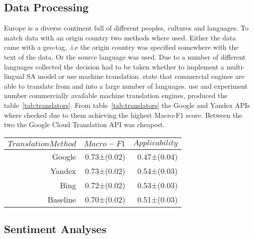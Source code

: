 \subsection{Data Processing}

Europe is a diverse continent full of different peoples, cultures and languages.
To match data with an origin country two methods where used.
Either the data came with a geo-tag, .i.e the origin country was specified somewhere with the text of the data.
Or the source language was used.
Due to a number of different languages collected the decision had to be taken whether to implement a multi-lingual \ac{SA} model or use machine translation.
\citet{Balahur2014} state that commercial engines are able to translate from and into a large number of languages.
\citet{Arajo2020} use and experiment number commercially available machine translation engines, produced the table~\ref{tab:translators}.
From table~\ref{tab:translators} the Google and Yandex \ac{API}s where checked due to them achieving the highest Macro-F1 score.
Between the two the Google Cloud Translation \ac{API} was cheapest.

\begin{table*}[ht!]\centering
{}
\begin{tabular}{rrr}\toprule
$Translation Method$ & $Macro-F1$ & $Applicability$\\ \midrule
Google& 0.73±(0.02)& 0.47±(0.04)&\\
Yandex& 0.73±(0.02)& 0.54±(0.03)&\\
Bing& 0.72±(0.02)& 0.53±(0.03)&\\
Baseline& 0.70±(0.02)& 0.51±(0.03)&\\
\bottomrule
\end{tabular}
\caption[Macro-F1 and Applicability mean () results on different Translation Methods]{Macro-F1 and Applicability mean () results given each machine translation system among all language datasets when translated to English.}\label{tab:translators}
\end{table*}

\subsection{Sentiment Analyses}

